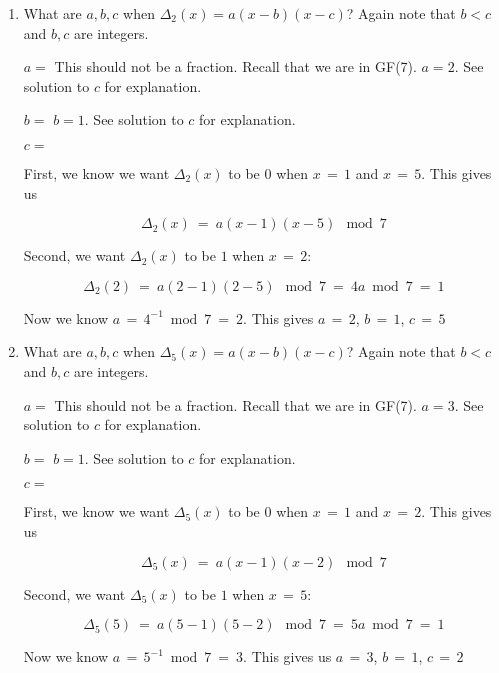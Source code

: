 \documentclass[11pt, preview]{standalone} %
\begin{document}
\begin{enumerate}
\begin{enumerate}
 \item What are $a,b,c$ when $\Delta_2(x) = a(x-b)(x-c)$? Again note that $b < c$ and $b,c$ are integers.
  \begin{Freeform}{2}
 $a = $
 \Hint This should not be a fraction. Recall that we are in GF(7).
 \Solution $a = 2$. See solution to $c$ for explanation.
 \end{Freeform}
  \begin{Freeform}{1}
 $b = $
 \Solution $b = 1$. See solution to $c$ for explanation.
 \end{Freeform}
  \begin{Freeform}{5}
 $c = $

 \Solution First, we know we want $\Delta_2(x)$ to be $0$ when $x\, =\, 1$ and $x\, =\, 5$. This gives us 

 $$\Delta_2(x)\ =\ a(x - 1)(x - 5)\ \bmod 7$$

 Second, we want $\Delta_2(x)$ to be $1$ when $x\, =\, 2$:

 $$\Delta_2(2)\ =\ a(2 - 1)(2 - 5)\ \bmod 7\ =\ 4a \bmod 7\ =\ 1$$

 Now we know $a\, =\, 4^{-1} \bmod 7\ =\ 2$. This gives $a\, =\, 2$, $b\, =\, 1$, $c\, =\, 5$
 \end{Freeform}
 
  \item What are $a,b,c$ when $\Delta_5(x) = a(x-b)(x-c)$? Again note that $b < c$ and $b,c$ are integers.
  \begin{Freeform}{3}
 $a = $
 \Hint This should not be a fraction. Recall that we are in GF(7).
 \Solution $a = 3$. See solution to $c$ for explanation.
 \end{Freeform}
  \begin{Freeform}{1}
 $b = $
 \Solution $b = 1$. See solution to $c$ for explanation.
 \end{Freeform}
  \begin{Freeform}{2}
 $c = $

 \Solution First, we know we want $\Delta_5(x)$ to be $0$ when $x\, =\, 1$ and $x\, =\, 2$. This gives us 

 $$\Delta_5(x)\ =\ a(x - 1)(x - 2)\ \bmod 7$$

 Second, we want $\Delta_5(x)$ to be $1$ when $x\, =\, 5$:

 $$\Delta_5(5)\ =\ a(5 - 1)(5 - 2)\ \bmod 7\ =\ 5a \bmod 7\ =\ 1$$

 Now we know $a\, =\, 5^{-1} \bmod 7\ =\ 3$. This gives us $a\, =\, 3$, $b\, =\, 1$, $c\, =\, 2$
 \end{Freeform}


\end{enumerate}
\end{enumerate}
\end{document}
